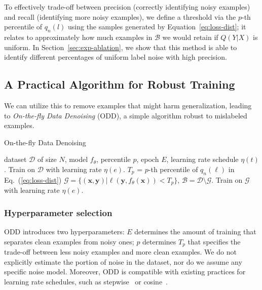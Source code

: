 \documentclass[a4paper,11pt]{article}
\newcommand{\mc}[1]{\mathcal{#1}}
\def\vx{{\bm{x}}}
\def\vy{{\bm{y}}}
\def\gB{{\mathcal{B}}}
\def\gD{{\mathcal{D}}}
\def\gG{{\mathcal{G}}}
\begin{document}
To effectively trade-off between precision (correctly identifying noisy examples) and recall (identifying more noisy examples), we define a threshold via the $p$-th percentile of $q_n(l)$ using the samples generated by Equation~\ref{eq:loss-dist}; it relates to approximately how much examples in $\mc{B}$ we would retain if $Q(Y|X)$ is uniform. In Section~\ref{sec:exp-ablation}, we show that this method is able to identify different percentages of uniform label noise with high precision.



\subsection{A Practical Algorithm for Robust Training}
We can utilize this to remove examples that might harm generalization, leading to \textit{On-the-fly Data Denoising} (\textsc{ODD}), a simple algorithm robust to mislabeled examples.

\begin{algorithm}
  \caption{On-the-fly Data Denoising}
  \label{alg:odd}
\begin{algorithmic}
   dataset $\gD$ of size $N$, model $f_\theta$, percentile $p$, epoch $E$, learning rate schedule $\eta(t)$.
  \STATE Train on $\gD$ with learning rate $\eta(e)$.
  \ENDFOR
  \STATE $T_p$ = $p$-th percentile of $q_n(\ell)$ in Eq.~(\ref{eq:loss-dist}) 
  \STATE $\gG = \{(\vx, \vy)| \ell(\vy, f_\theta(\vx)) < T_p\}$, $\gB = \gD \setminus \gG$.
  \STATE Train on $\gG$ with learning rate $\eta(e)$.
  \ENDFOR
\end{algorithmic}
\end{algorithm}




\subsubsection{Hyperparameter selection} \textsc{ODD} introduces two hyperparameters: $E$ determines the amount of training that separates clean examples from noisy ones; $p$ determines $T_p$ that specifies the trade-off between less noisy examples and more clean examples. We do not explicitly estimate the portion of noise in the dataset, nor do we assume any specific noise model. Moreover, \textsc{ODD} is compatible with existing practices for learning rate schedules, such as stepwise~\cite{he2015deep} or cosine~\cite{loshchilov2016sgdr}.
\end{document}
